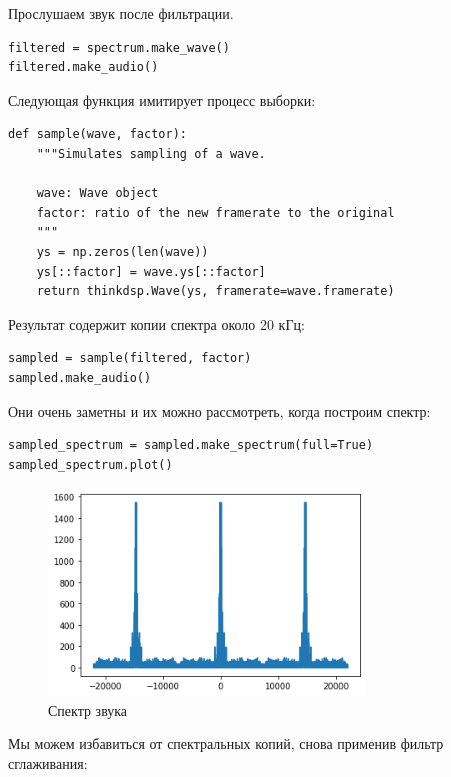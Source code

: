 \documentclass[a4paper,12pt]{report}
\begin{document}
Прослушаем звук после фильтрации.

\begin{lstlisting}[caption=Прослушивание звука]
filtered = spectrum.make_wave()
filtered.make_audio()
\end{lstlisting}

Следующая функция имитирует процесс выборки:

\begin{lstlisting}[caption=Функция \texttt{sample}]
def sample(wave, factor):
    """Simulates sampling of a wave.
    
    wave: Wave object
    factor: ratio of the new framerate to the original
    """
    ys = np.zeros(len(wave))
    ys[::factor] = wave.ys[::factor]
    return thinkdsp.Wave(ys, framerate=wave.framerate)
\end{lstlisting}

Результат содержит копии спектра около 20 кГц:

\begin{lstlisting}[caption=Прослушивание звука]
sampled = sample(filtered, factor)
sampled.make_audio()
\end{lstlisting}

Они очень заметны и их можно рассмотреть, когда построим спектр:

\begin{lstlisting}[caption=Спектр звука]
sampled_spectrum = sampled.make_spectrum(full=True)
sampled_spectrum.plot()
\end{lstlisting}

\begin{figure}[H]
        \centering
        \includegraphics[width=0.75\textwidth]{lab11_fig3_4.png}
        \caption{Спектр звука}
        \label{fig:lab11_fig3_4}
\end{figure}

Мы можем избавиться от спектральных копий, снова применив фильтр сглаживания:
\end{document}
